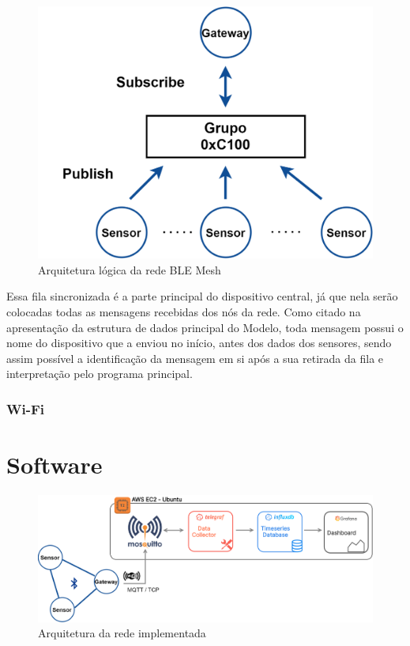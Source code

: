 \documentclass[../monografia.tex]{subfiles}
\begin{document}
\begin{figure}[h!]
	\centering
	\includegraphics[scale=0.22]{ble-mesh-architecture.png}
	\caption{Arquitetura lógica da rede BLE Mesh}
	\label{fig:mesh-network-architecture}
\end{figure}

Essa fila sincronizada é a parte principal do dispositivo central, já que nela serão colocadas todas as mensagens recebidas dos nós da rede. Como citado na apresentação da estrutura de dados principal do Modelo, toda mensagem possui o nome do dispositivo que a enviou no início, antes dos dados dos sensores, sendo assim possível a identificação da mensagem em si após a sua retirada da fila e interpretação pelo programa principal.


\subsubsection{Wi-Fi}


\section{Software}

\begin{figure}[h!]
	\centering
	\includegraphics[scale=0.18]{network-architecture.png}
	\caption{Arquitetura da rede implementada}
	\label{fig:network-architecture}
\end{figure}
\end{document}
